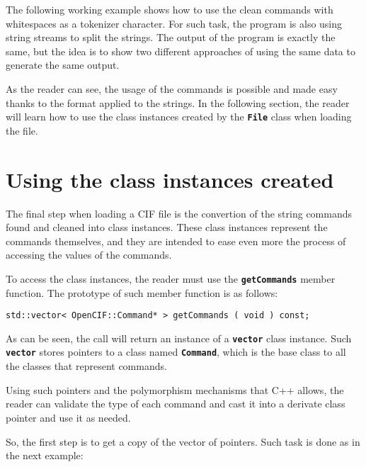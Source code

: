 \documentclass[11pt,twoside,openany,x11names,svgnames]{memoir}
\begin{document}
The following working example shows how to use the clean commands with whitespaces as a tokenizer character. For such task, the program is also using string streams to split the strings. The output of the program is exactly the same, but the idea is to show two different approaches of using the same data to generate the same output.



As the reader can see, the usage of the commands is possible and made easy thanks to the format applied to the strings. In the following section, the reader will learn how to use the class instances created by the \textbf{\texttt{File}} class when loading the file.

\section{Using the class instances created}\label{Using-the-class-instances-created}

The final step when loading a CIF file is the convertion of the string commands found and cleaned into class instances. These class instances represent the commands themselves, and they are intended to ease even more the process of accessing the values of the commands.

To access the class instances, the reader must use the \textbf{\texttt{getCommands}} member function. The prototype of such member function is as follows:

\begin{lstlisting}[frame=single,style=CPPStyle]
std::vector< OpenCIF::Command* > getCommands ( void ) const;
\end{lstlisting}

As can be seen, the call will return an instance of a \textbf{\texttt{vector}} class instance. Such \textbf{\texttt{vector}} stores pointers to a class named \textbf{\texttt{Command}}, which is the base class to all the classes that represent commands.

Using such pointers and the polymorphism mechanisms that C++ allows, the reader can validate the type of each command and cast it into a derivate class pointer and use it as needed.

So, the first step is to get a copy of the vector of pointers. Such task is done as in the next example:
\end{document}
